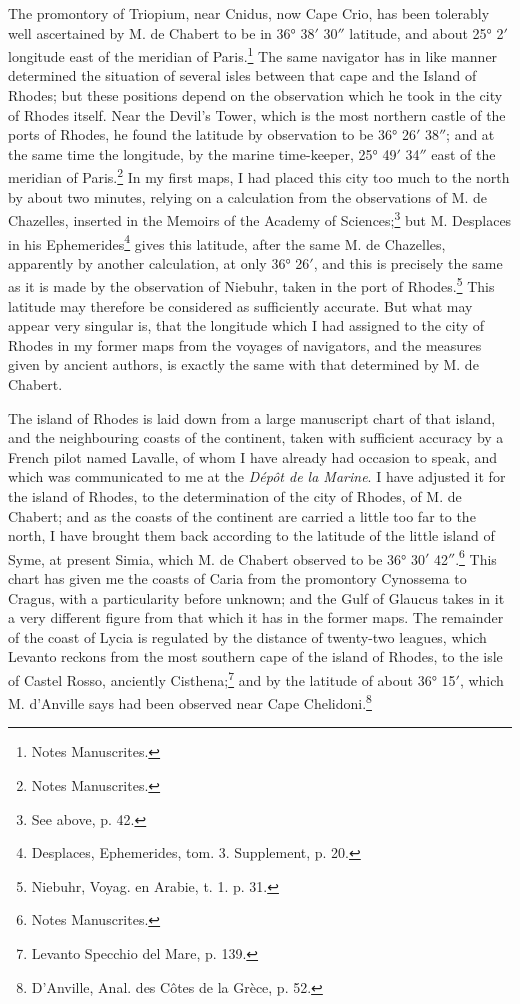 \documentclass[a4paper, 11pt, oneside, polutonikogreek, english]{article}
\begin{document}
The promontory of Triopium, near Cnidus, now Cape Crio, has been tolerably well ascertained by M. de Chabert to be in 36° 38$'$ 30$''$ latitude, and about 25° 2$'$ longitude east of the meridian of Paris.\footnote{Notes Manuscrites.} The same navigator has in like manner determined the situation of several isles between that cape and the Island of Rhodes; but these positions depend on the observation which he took in the city of Rhodes itself. Near the Devil's Tower, which is the most northern castle of the ports of Rhodes, he found the latitude by observation to be 36° 26$'$ 38$''$; and at the same time the longitude, by the marine time-keeper, 25° 49$'$ 34$''$ east of the meridian of Paris.\footnote{Notes Manuscrites.} In my first maps, I had placed this city too much to the north by about two minutes, relying on a calculation from the observations of M. de Chazelles, inserted in the Memoirs of the Academy of Sciences;\footnote{See above, p. 42.} but M. Desplaces in his Ephemerides\footnote{Desplaces, Ephemerides, tom. 3. Supplement, p. 20.} gives this latitude, after the same M. de Chazelles, apparently by another calculation, at only 36° 26$'$, and this is precisely the same as it is made by the observation of Niebuhr, taken in the port of Rhodes.\footnote{Niebuhr, Voyag. en Arabie, t. 1. p. 31.} This latitude may therefore be considered as sufficiently accurate. But what may appear very singular is, that the longitude which I had assigned to the city of Rhodes in my former maps from the voyages of navigators, and the measures given by ancient authors, is exactly the same with that determined by M. de Chabert.

The island of Rhodes is laid down from a large manuscript chart of that island, and the neighbouring coasts of the continent, taken with sufficient accuracy by a French pilot named Lavalle, of whom I have already had occasion to speak, and which was communicated to me at the \emph{Dépôt de la Marine}. I have adjusted it for the island of Rhodes, to the determination of the city of Rhodes, of M. de Chabert; and as the coasts of the continent are carried a little too far to the north, I have brought them back according to the latitude of the little island of Syme, at present Simia, which M. de Chabert observed to be 36° 30$'$ 42$''$.\footnote{Notes Manuscrites.} This chart has given me the coasts of Caria from the promontory Cynossema to Cragus, with a particularity before unknown; and the Gulf of Glaucus takes in it a very different figure from that which it has in the former maps. The remainder of the coast of Lycia is regulated by the distance of twenty-two leagues, which Levanto reckons from the most southern cape of the island of Rhodes, to the isle of Castel Rosso, anciently Cisthena;\footnote{Levanto Specchio del Mare, p. 139.} and by the latitude of about 36° 15$'$, which M. d'Anville says had been observed near Cape Chelidoni.\footnote{D'Anville, Anal. des Côtes de la Grèce, p. 52.}
\end{document}
